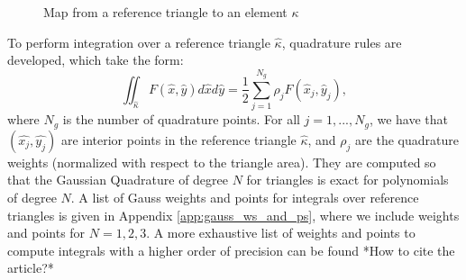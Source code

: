 \documentclass{uonmathreport}
\begin{document}
\begin{figure}[h]
	\centering
	\caption{Map from a reference triangle to an element $\kappa$}
	\label{fig:tri_map}
\end{figure}
To perform integration over a reference triangle $\hat{\kappa}$, quadrature rules are developed, which take the form:
\begin{equation}\label{eqn:quad_ref_tri}
\iint_{\hat{\kappa}} F(\hat{x}, \hat{y}) d\hat{x} d\hat{y} = \frac{1}{2} \sum_{j=1}^{N_g} \rho_j F(\hat{x}_j, \hat{y}_j),
\end{equation}
where $N_g$ is the number of quadrature points. For all $j = 1,...,N_g$, we have that $(\hat{x_j}, \hat{y_j})$ are interior points in the reference triangle $\hat{\kappa}$, and $\rho_j$ are the quadrature weights (normalized with respect to the triangle area). They are computed so that the Gaussian Quadrature of degree $N$ for triangles is exact for polynomials of degree $N$. A list of Gauss weights and points for integrals over reference triangles is given in Appendix \ref{app:gauss_ws_and_ps}, where we include weights and points for $N=1,2,3$. A more exhaustive list of weights and points to compute integrals with a higher order of precision can be found *How to cite the article?* 
\end{document}

